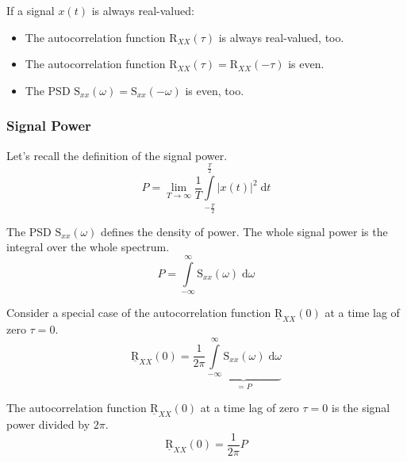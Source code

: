 \begin{refsection}
If a signal $x(t)$ is always real-valued:
\begin{itemize}
	\item The autocorrelation function $\mathrm{R}_{XX}(\tau)$ is always real-valued, too.
	\item The autocorrelation function $\mathrm{R}_{XX}(\tau) = \mathrm{R}_{XX}(-\tau)$ is even.
	\item The \ac{PSD} $\mathrm{S}_{xx}(\omega) = \mathrm{S}_{xx}(- \omega)$ is even, too.
\end{itemize}


\subsubsection{Signal Power}

Let's recall the definition of the signal power.
\begin{equation}
	P = \lim\limits_{T \rightarrow \infty} \frac{1}{T} \int\limits_{-\frac{T}{2}}^{\frac{T}{2}} \left|x(t)\right|^2 \; \mathrm{d} t
\end{equation}

The \ac{PSD} $\mathrm{S}_{xx}(\omega)$ defines the density of power. The whole signal power is the integral over the whole spectrum.
\begin{equation}
	P = \int\limits_{-\infty}^{\infty} \mathrm{S}_{xx}(\omega) \; \mathrm{d} \omega
\end{equation}

Consider a special case of the autocorrelation function $\underline{\mathrm{R}}_{XX}(0)$ at a time lag of zero $\tau = 0$.
\begin{equation}
	\underline{\mathrm{R}}_{XX}(0) = \frac{1}{2 \pi} \underbrace{\int\limits_{-\infty}^{\infty} \mathrm{S}_{xx}(\omega) \; \mathrm{d} \omega}_{= P}
\end{equation}

The autocorrelation function $\underline{\mathrm{R}}_{XX}(0)$ at a time lag of zero $\tau = 0$ is the signal power divided by $2 \pi$.
\begin{equation}
	\underline{\mathrm{R}}_{XX}(0) = \frac{1}{2 \pi} P
\end{equation}


\end{refsection}
